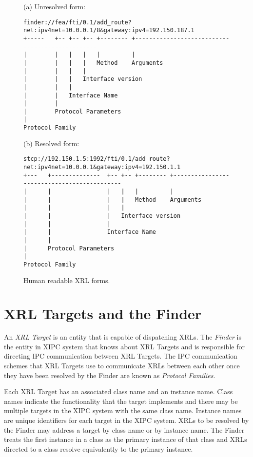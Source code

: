 \documentclass[11pt]{article}
\begin{document}
\clearpage
\begin{sidewaysfigure}
(a) Unresolved form:

\begin{centering}
\small\begin{verbatim}
finder://fea/fti/0.1/add_route?net:ipv4net=10.0.0.1/8&gateway:ipv4=192.150.187.1
+-----   +-- +-- +-- +-------- +------------------------------------------------
|        |   |   |   |         |
|        |   |   |   Method    Arguments
|        |   |   |
|        |   |   Interface version 
|        |   |
|        |   Interface Name  
|        | 
|        Protocol Parameters
|
Protocol Family
\end{verbatim}
\end{centering}
\normalsize

(b) Resolved form:

\small
\begin{verbatim}
stcp://192.150.1.5:1992/fti/0.1/add_route?net:ipv4net=10.0.0.1&gateway:ipv4=192.150.1.1
+---   +--------------  +-- +-- +-------- +--------------------------------------------
|      |                |   |   |         |
|      |                |   |   Method    Arguments
|      |                |   |
|      |                |   Interface version 
|      |                |
|      |                Interface Name  
|      | 
|      Protocol Parameters
|
Protocol Family
\end{verbatim}
\normalsize
\caption{\label{fig:human-readable}Human readable XRL forms.}
\end{sidewaysfigure}
\clearpage

\section{XRL Targets and the Finder}

An {\em XRL Target} is an entity that is capable of dispatching XRLs.
The {\em Finder} is the entity in XIPC system that knows about XRL
Targets and is responsible for directing IPC communication between XRL
Targets.  The IPC communication schemes that XRL Targets use to
communicate XRLs between each other once they have been resolved by
the Finder are known as {\em Protocol Families}.

Each XRL Target has an associated class name and an instance name.
Class names indicate the functionality that the target implements and
there may be multiple targets in the XIPC system with the same class
name.  Instance names are unique identifiers for each target in the
XIPC system.  XRLs to be resolved by the Finder may address a target
by class name or by instance name.  The Finder treats the first
instance in a class as the primary instance of that class and XRLs
directed to a class resolve equivalently to the primary instance.
\end{document}
